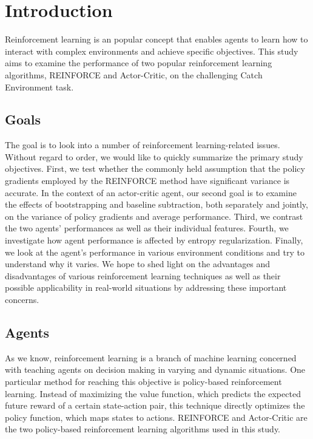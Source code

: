 \documentclass{article}
\begin{document}
    \section{Introduction}
    \label{Introduction}
    Reinforcement learning is an popular concept that enables agents to learn how to interact with complex environments and achieve specific objectives.
    This study aims to examine the performance of two popular reinforcement learning algorithms, REINFORCE and Actor-Critic, on the challenging Catch Environment task.
    
    \subsection{Goals}
    \label{I-Goals}
    The goal is to look into a number of reinforcement learning-related issues.
    Without regard to order, we would like to quickly summarize the primary study objectives.
    First, we test whether the commonly held assumption that the policy gradients employed by the REINFORCE method have significant variance is accurate. \cite{RL_book} %
    In the context of an actor-critic agent, our second goal is to examine the effects of bootstrapping and baseline subtraction, both separately and jointly, on the variance of policy gradients and average performance.
    Third, we contrast the two agents' performances as well as their individual features.
    Fourth, we investigate how agent performance is affected by entropy regularization.
    Finally, we look at the agent's performance in various environment conditions and try to understand why it varies. 
    We hope to shed light on the advantages and disadvantages of various reinforcement learning techniques as well as their possible applicability in real-world situations by addressing these important concerns.
    
    \subsection{Agents}
    \label{I-Agents}
    As we know, reinforcement learning is a branch of machine learning concerned with teaching agents on decision making in varying and dynamic situations.
    One particular method for reaching this objective is policy-based reinforcement learning. 
    Instead of maximizing the value function, which predicts the expected future reward of a certain state-action pair, this technique directly optimizes the policy function, which maps states to actions. 
    REINFORCE and Actor-Critic are the two policy-based reinforcement learning algorithms used in this study.
    
\end{document}
